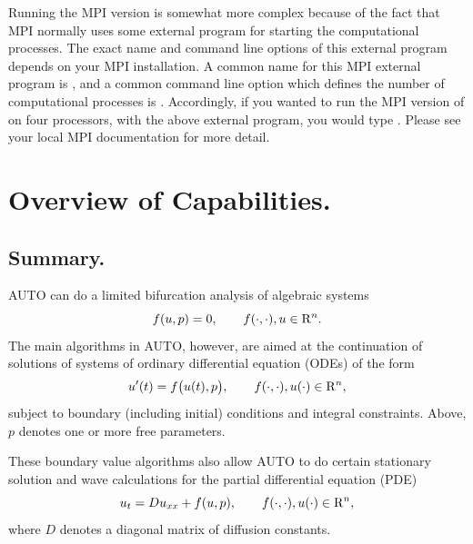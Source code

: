 \documentclass[12pt]{report}
\def\Rn{{\rm R}^n}
\begin{document}
Running the MPI version is somewhat more complex because of the fact
that MPI normally uses some external program for starting the
computational processes.  The exact name and command line options of
this external program depends on your MPI installation.  A common name
for this MPI external program is , and a common command
line option which defines the number of computational processes is .  Accordingly, if you wanted to run the MPI version of \AUTO
on four processors, with the above external program, you would
type .  Please see your local MPI
documentation for more detail.

\chapter{ Overview of Capabilities.} \label{ch:Overview}
\section{ Summary.} \label{sec:Summary}
{\cal AUTO} can do a limited bifurcation analysis of algebraic systems
\begin{equation} \label{1} 
  f( u , p ) = 0 ,  \qquad  f(\cdot,\cdot) , u \in \Rn.
\end{equation}
The main algorithms in {\cal AUTO}, however, are aimed at the continuation
of solutions of systems of ordinary differential equation (ODEs) of the form
\begin{equation} \label{2} 
 u'(t) = f\bigl( u(t) , p \bigr) , 
  \qquad  f(\cdot,\cdot) , u(\cdot) \in \Rn,
\end{equation}
subject to boundary (including initial) conditions and integral constraints.
Above, $p$ denotes one or more free parameters.

These boundary value algorithms also allow {\cal AUTO} to do certain stationary 
solution and wave calculations for the partial differential equation (PDE)
\begin{equation} \label{3} 
  u_t = D u_{xx} + f( u , p ), 
  \qquad  f(\cdot,\cdot) , u(\cdot) \in \Rn,
\end{equation}
where $D$ denotes a diagonal matrix of diffusion constants.
\end{document}
